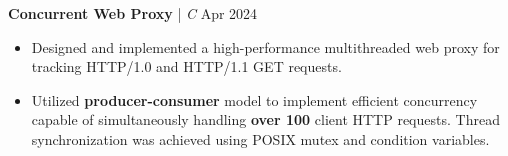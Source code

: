 \textbf{Concurrent Web Proxy} | \textit{C} \hfill Apr 2024 \par
\begin{itemize}
	\item Designed and implemented a high-performance multithreaded web proxy for tracking HTTP/1.0 and HTTP/1.1 GET requests.
	\item Utilized \textbf{producer-consumer} model to implement efficient concurrency capable of simultaneously handling \textbf{over 100} client HTTP requests. Thread synchronization was achieved using POSIX mutex and condition variables.
\end{itemize} \par